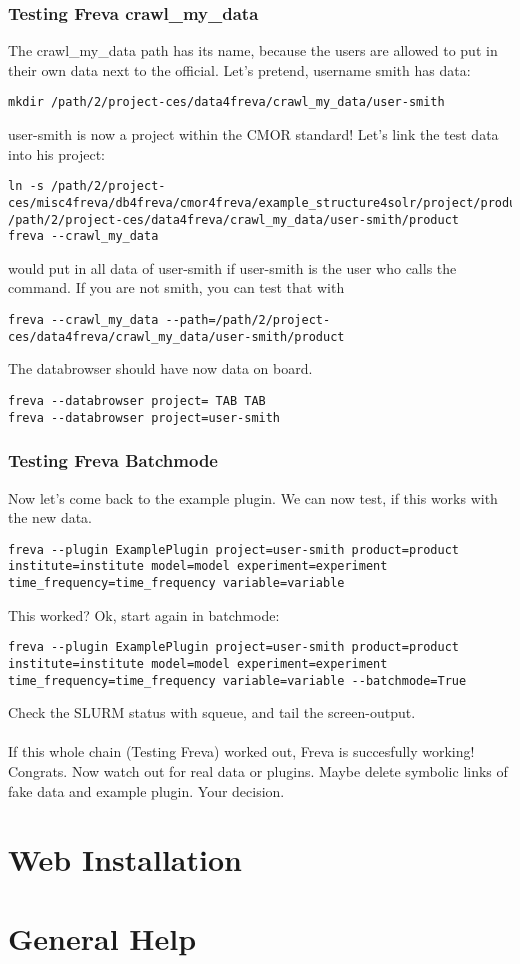 \documentclass[a4paper,11pt]{ltxdoc}
\begin{document}
\subsubsection{Testing Freva crawl\_my\_data}
The crawl\_my\_data path has its name, because the users are allowed to put in their own data next to the official. Let's pretend, username smith has data:
\begin{lstlisting} 
mkdir /path/2/project-ces/data4freva/crawl_my_data/user-smith\end{lstlisting}
user-smith is now a project within the CMOR standard! Let's link the test data into his project:
\begin{lstlisting}
ln -s /path/2/project-ces/misc4freva/db4freva/cmor4freva/example_structure4solr/project/product /path/2/project-ces/data4freva/crawl_my_data/user-smith/product
freva --crawl_my_data \end{lstlisting}
would put in all data of user-smith if user-smith is the user who calls the command. If you are not smith, you can test that with
\begin{lstlisting}
freva --crawl_my_data --path=/path/2/project-ces/data4freva/crawl_my_data/user-smith/product\end{lstlisting}
The databrowser should have now data on board.
\begin{lstlisting}freva --databrowser project= TAB TAB
freva --databrowser project=user-smith\end{lstlisting}
\subsubsection{Testing Freva Batchmode}
Now let's come back to the example plugin. We can now test, if this works with the new data.
\begin{lstlisting}
freva --plugin ExamplePlugin project=user-smith product=product institute=institute model=model experiment=experiment time_frequency=time_frequency variable=variable\end{lstlisting}
This worked? Ok, start again in batchmode:
\begin{lstlisting}
freva --plugin ExamplePlugin project=user-smith product=product institute=institute model=model experiment=experiment time_frequency=time_frequency variable=variable --batchmode=True\end{lstlisting}
Check the SLURM status with squeue, and tail the screen-output. \\
\\
If this whole chain (Testing Freva) worked out, Freva is succesfully working! Congrats. Now watch out for real data or plugins. Maybe delete symbolic links of fake data and example plugin. Your decision.

\section{Web Installation} \label{web}
\section{General Help} \label{general}
\end{document}
